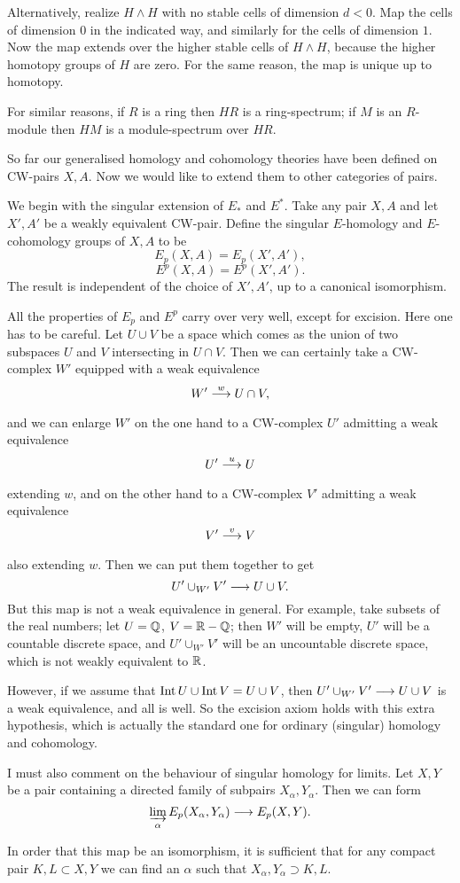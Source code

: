 \documentclass[../main]{subfiles}
\begin{document}
Alternatively, realize $H \wedge H$ with no stable cells of dimension $d < 0$. Map the cells of dimension $0$ in the indicated way, and similarly for the cells of dimension $1$. Now the map extends over the higher stable cells of $H \wedge H$, because the higher homotopy groups of $H$ are zero. For the same reason, the map is unique up to homotopy.

For similar reasons, if $R$ is a ring then $HR$ is a ring-spectrum; if $M$ is an $R$-module then $HM$ is a module-spectrum over $HR$.

So far our generalised homology and cohomology theories have been defined on CW-pairs $X,A$. Now we would like to extend them to other categories of pairs.

We begin with the singular extension of $E_*$ and $E^*$. Take any pair $X,A$ and let $X',A'$ be a weakly equivalent CW-pair. Define the singular $E$-homology and $E$-cohomology groups of $X,A$ to be
\[E_p(X,A) = E_p(X',A'),\]
\[E^p(X,A) = E^p(X',A').\]
The result is independent of the choice of $X',A'$, up to a canonical isomorphism.

All the properties of $E_p$ and $E^p$ carry over very well, except for excision. Here one has to be careful. Let $U \cup V$ be a space which comes as the union of two subspaces $U$ and $V$ intersecting in $U \cap V$. Then we can certainly take a CW-complex $W'$ equipped with a weak equivalence
\[W' \lar{w}U \cap V,\]
and we can enlarge $W'$ on the one hand to a CW-complex $U'$ admitting a weak equivalence 
\[U' \lar{u} U\]
extending $w$, and on the other hand to a CW-complex $V'$ admitting a weak equivalence 
\[V' \lar{v} V\]
also extending $w$. Then we can put them together to get
\[U' \cup_{W'} V' \longrightarrow  U \cup V.\]
But this map is not a weak equivalence in general. For example, take subsets of the real numbers; let $U = \mathbb{Q}$, $V=\mathbb{R} - \mathbb{Q}$; then $W'$ will be empty, $U'$ will be a countable discrete space, and $U' \cup_{W'} V'$ will be an uncountable discrete space, which is not weakly equivalent to $\mathbb{R}$.

However, if we assume that $\operatorname{Int} U \cup \operatorname{Int} V = U \cup V$, then $U' \cup_{W'} V' \longrightarrow U \cup V$ is a weak equivalence, and all is well. So the excision axiom holds with this extra hypothesis, which is actually the standard one for ordinary (singular) homology and cohomology.

I must also comment on the behaviour of singular homology for limits. Let $X,Y$ be a pair containing a directed family of subpairs $X_\alpha,Y_\alpha$. Then we can form
\[\varinjlim_\alpha E_p(X_\alpha,Y_\alpha) \longrightarrow E_p(X,Y).\]
\begin{proposition}\label{prop:p3c10.1}
In order that this map be an isomorphism, it is sufficient that for any compact pair $K,L \subset X,Y$ we can find an $\alpha$ such that $X_\alpha,Y_\alpha \supset K,L$.
\end{proposition}
\end{document}
